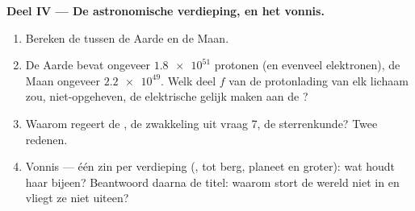 \begin{problem}
\medskip
\noindent\textbf{Deel IV --- De astronomische verdieping, en het
vonnis.}
\begin{enumerate}[resume]
  \item Bereken de  tussen de Aarde en de Maan.
  \item De Aarde bevat ongeveer $\num{1.8e51}$ protonen (en evenveel
        elektronen), de Maan ongeveer $\num{2.2e49}$. Welk deel $f$ van
        de protonlading van elk lichaam zou, niet-opgeheven, de
        elektrische  gelijk maken aan de ?
  \item Waarom regeert de , de zwakkeling uit vraag 7, de
        sterrenkunde? Twee redenen.
  \item Vonnis --- één zin per verdieping (,  tot berg, planeet
        en groter): wat houdt haar bijeen? Beantwoord daarna de titel:
        waarom stort de wereld niet in en vliegt ze niet uiteen?
\end{enumerate}
\end{problem}
